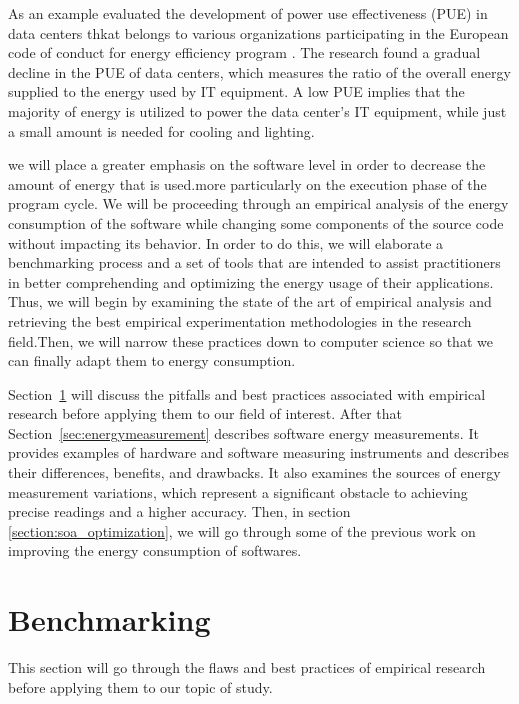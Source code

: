 As an example \citeauthor{avgerinou2017trends} evaluated the development of power use effectiveness (PUE) in data centers thkat belongs to various organizations participating in the European code of conduct for energy efficiency program \cite{avgerinou2017trends}.
The research found a gradual decline in the PUE of data centers, which measures the ratio of the overall energy supplied to the energy used by IT equipment.
A low PUE implies that the majority of energy is utilized to power the data center's IT equipment, while just a small amount is needed for cooling and lighting.

we will place a greater emphasis on the software level in order to decrease the amount of energy that is used.more particularly on the execution phase of the program cycle.
We will be proceeding through an empirical analysis of the energy consumption of the software while changing some components of the source code without impacting its behavior.
In order to do this, we will elaborate a benchmarking process and a set of tools that are intended to assist practitioners in better comprehending and optimizing the energy usage of their applications.
Thus, we will begin by examining the state of the art of empirical analysis and retrieving the best empirical experimentation methodologies in the research field.Then, we will narrow these practices down to computer science so that we can finally adapt them to energy consumption.

Section~\ref{sec:soa_benchmarking} will discuss the pitfalls and best practices associated with empirical research before applying them to our field of interest.
After that Section~\ref{sec:energymeasurement} describes software energy measurements.
It provides examples of hardware and software measuring instruments and describes their differences, benefits, and drawbacks. It also examines the sources of energy measurement variations, which represent a significant obstacle to achieving precise readings and a higher accuracy.
Then, in section \ref{section:soa_optimization}, we will go through some of the previous work on improving the energy consumption of softwares.

\newpage
\section{Benchmarking}\label{sec:soa_benchmarking}
This section will go through the flaws and best practices of empirical research before applying them to our topic of study.

